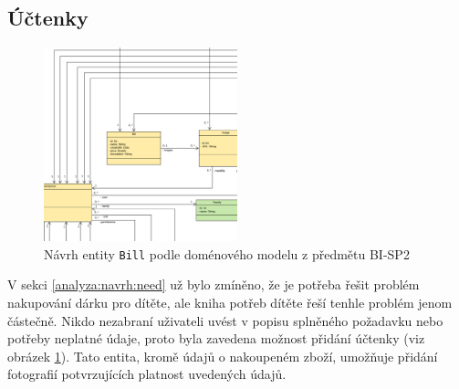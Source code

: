     \subsection{Účtenky}
        \begin{figure}\centering
	        \includegraphics[width=0.5\textwidth]{pdfs/Bill1}
	        \caption[Návrh entity \texttt{Bill}]{Návrh entity \texttt{Bill} podle doménového modelu z předmětu BI-SP2}\label{image:bill1}
        \end{figure}
        V sekci \ref{analyza:navrh:need} už bylo zmíněno, že je potřeba řešit problém nakupování dárku pro dítěte, ale kniha potřeb dítěte řeší tenhle problém jenom částečně. Nikdo nezabraní uživateli uvést v popisu splněného požadavku nebo potřeby neplatné údaje, proto byla zavedena možnost přidání účtenky (viz obrázek \ref{image:bill1}). Tato entita, kromě údajů o nakoupeném zboží, umožňuje přidání fotografií potvrzujících platnost uvedených údajů.
    
